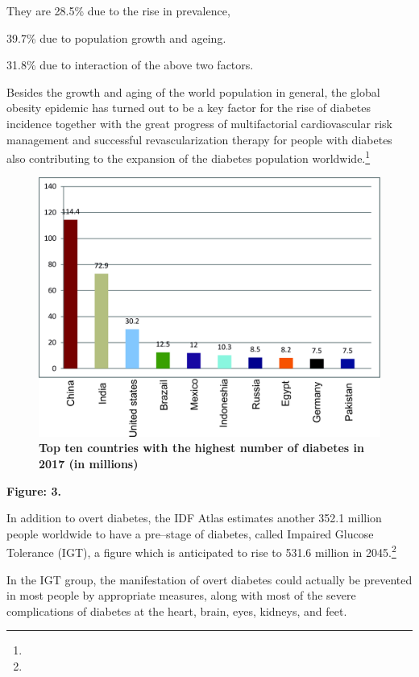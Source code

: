 \item They are 28.5\% due to the rise in prevalence,

 \item 39.7\% due to population growth and ageing.

 \item 31.8\% due to interaction of the above two factors.

Besides the growth and aging of the world population in general, the global obesity epidemic has turned out to be a key factor for the rise of diabetes incidence together with the great progress of multifactorial cardiovascular risk management and successful revascularization therapy for people with diabetes also contributing to the expansion of the diabetes population worldwide.\footnote{}

\begin{figure}
\caption{\textbf{Top ten countries with the highest number of diabetes in 2017 (in millions)}}
\includegraphics{images/036.jpg}
\end{figure}

\textbf{Figure: 3.}

In addition to overt diabetes, the IDF Atlas estimates another 352.1 million people worldwide to have a pre–stage of diabetes, called Impaired Glucose Tolerance (IGT), a figure which is anticipated to rise to 531.6 million in 2045.\footnote{}

In the IGT group, the manifestation of overt diabetes could actually be prevented in most people by appropriate measures, along with most of the severe complications of diabetes at the heart, brain, eyes, kidneys, and feet.

